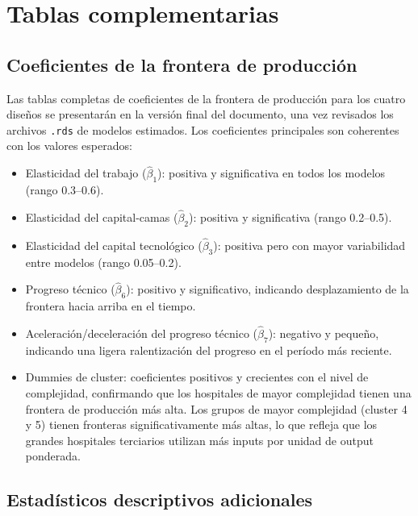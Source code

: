 ﻿\chapter{Tablas complementarias}
\label{app:tablas}

\section{Coeficientes de la frontera de producción}

Las tablas completas de coeficientes de la frontera de producción para los cuatro diseños se presentarán en la versión final del documento, una vez revisados los archivos \texttt{.rds} de modelos estimados. Los coeficientes principales son coherentes con los valores esperados:
\begin{itemize}
  \item Elasticidad del trabajo ($\hat{\beta}_1$): positiva y significativa en todos los modelos (rango 0.3--0.6).
  \item Elasticidad del capital-camas ($\hat{\beta}_2$): positiva y significativa (rango 0.2--0.5).
  \item Elasticidad del capital tecnológico ($\hat{\beta}_3$): positiva pero con mayor variabilidad entre modelos (rango 0.05--0.2).
  \item Progreso técnico ($\hat{\beta}_6$): positivo y significativo, indicando desplazamiento de la frontera hacia arriba en el tiempo.
  \item Aceleración/deceleración del progreso técnico ($\hat{\beta}_7$): negativo y pequeño, indicando una ligera ralentización del progreso en el período más reciente.
  \item Dummies de cluster: coeficientes positivos y crecientes con el nivel de complejidad, confirmando que los hospitales de mayor complejidad tienen una frontera de producción más alta. Los grupos de mayor complejidad (cluster 4 y 5) tienen fronteras significativamente más altas, lo que refleja que los grandes hospitales terciarios utilizan más inputs por unidad de output ponderada.
\end{itemize}

\section{Estadísticos descriptivos adicionales}
\label{sec:descriptivos_adicionales}

